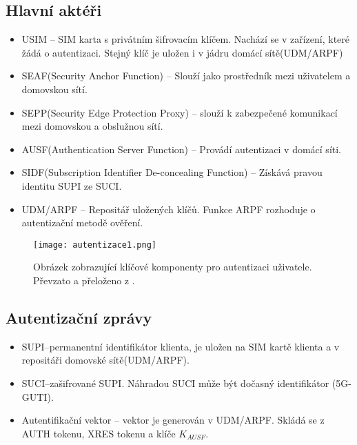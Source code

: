 \subsection{Hlavní aktéři}
\begin{itemize}
    \item  USIM -- SIM karta s privátním šifrovacím klíčem. Nachází se v zařízení, které žádá o autentizaci. Stejný klíč je uložen i v jádru domácí sítě(UDM/ARPF)
    \item SEAF(Security Anchor Function) -- Slouží jako prostředník mezi uživatelem a domovskou sítí. 
    \item  SEPP(Security Edge Protection Proxy) -- slouží k zabezpečené komunikací mezi domovskou a obslužnou sítí.
    \item  AUSF(Authentication Server Function) -- Provádí autentizaci v domácí síti. 
   \item  SIDF(Subscription Identifier De-concealing Function) -- Získává pravou identitu SUPI ze SUCI.
    \item UDM/ARPF -- Repositář uložených klíčů. Funkce ARPF rozhoduje o autentizační metodě ověření.
\end{itemize} 
\begin{figure}[!ht]
\centering
   \texttt{[image: autentizace1.png]}
    \caption{Obrázek zobrazující klíčové komponenty pro autentizaci uživatele. Převzato a přeloženo z \cite{Schwarz}.}
    \label{fig:autentizace1}
\end{figure}
\subsection{Autentizační zprávy}
\begin{itemize}
    \item  SUPI--permanentní identifikátor klienta, je uložen na SIM kartě klienta a v repositáři domovské sítě(UDM/ARPF). 
    \item  SUCI--zašifrované SUPI. Náhradou SUCI může být dočasný identifikátor (5G-GUTI).
    \item Autentifikační vektor\label{vector} -- vektor je generován v UDM/ARPF. Skládá se z AUTH tokenu, XRES tokenu a klíče $K_{AUSF}$.
\end{itemize} 
\newpage
